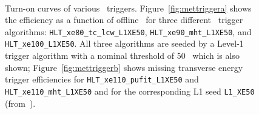 					\begin{figure}[!htb]
						\begin{center}
							\\%
						\end{center}
						\caption{Turn-on curves of various \met\ triggers. Figure~\ref{fig:mettriggera} shows the efficiency as a function of offline \met\ for three different \met\ trigger algorithms: \texttt{HLT\_xe80\_tc\_lcw\_L1XE50}, \texttt{HLT\_xe90\_mht\_L1XE50}, and \texttt{HLT\_xe100\_L1XE50}. All three algorithms are seeded by a Level-1 trigger algorithm with a nominal threshold of 50 \GeV\ which is also shown; Figure~\ref{fig:mettriggerb} shows missing transverse energy trigger efficiencies for \texttt{HLT\_xe110\_pufit\_L1XE50} and \texttt{HLT\_xe110\_mht\_L1XE50} and for the corresponding \ac{L1} seed \texttt{L1\_XE50} (from~\cite{ATLASMETTriggerPublicPage}).}
						\label{fig:mettrigger}
					\end{figure}
